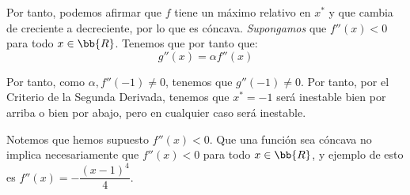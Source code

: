 \begin{ejercicio}
    Por tanto, podemos afirmar que $f$ tiene un máximo relativo en $x^\ast$ y que cambia de creciente a decreciente, por lo que es cóncava. \emph{Supongamos} que $f''(x)<0$ para todo $x\in \bb{R}$. Tenemos que por tanto que:
    \begin{equation*}
        g''(x)=\alpha f''(x)
    \end{equation*}

    Por tanto, como $\alpha,f''(-1)\neq 0$, tenemos que $g''(-1)\neq 0$. Por tanto, por el Criterio de la Segunda Derivada, tenemos que $x^\ast=-1$ será inestable bien por arriba o bien por abajo, pero en cualquier caso será inestable.

    \begin{observacion}
        Notemos que hemos supuesto $f''(x)<0$. Que una función sea cóncava no implica necesariamente que $f''(x)<0$ para todo $x\in \bb{R}$, y ejemplo de esto es $f''(x)=-\dfrac{(x-1)^4}{4}$.
    \end{observacion}
\end{ejercicio}

